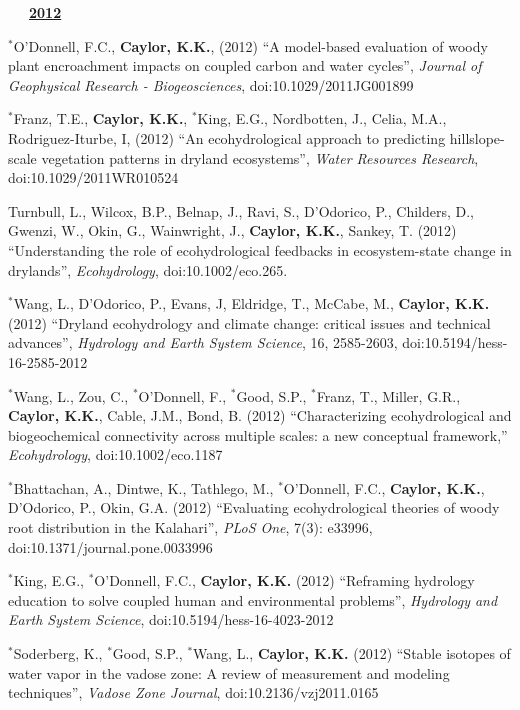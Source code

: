 \documentclass[10pt]{report}
\begin{document}
\begin{etaremune}
\mbox{\ \ \ \underline{\textbf{2012}}}

\item $^{*}$O'Donnell, F.C.,  \textbf{Caylor, K.K.}, (2012) ``A model-based evaluation of woody plant encroachment impacts on coupled carbon and water cycles'', {\em Journal of Geophysical Research - Biogeosciences}, doi:10.1029/2011JG001899

\item $^{*}$Franz, T.E., \textbf{Caylor, K.K.}, $^{*}$King, E.G., Nordbotten, J., Celia, M.A., Rodriguez-Iturbe, I, (2012) ``An ecohydrological approach to predicting hillslope-scale vegetation patterns in dryland ecosystems'', {\em Water Resources Research}, doi:10.1029/2011WR010524

\item Turnbull, L., Wilcox, B.P., Belnap, J., Ravi, S., D'Odorico, P., Childers, D., Gwenzi, W., Okin, G., Wainwright, J., \textbf{Caylor, K.K.}, Sankey, T. (2012) ``Understanding the role of ecohydrological feedbacks in ecosystem-state change in drylands'', {\em Ecohydrology}, doi:10.1002/eco.265.

\item $^{*}$Wang, L., D'Odorico, P., Evans, J, Eldridge, T., McCabe, M., \textbf{Caylor, K.K.} (2012) ``Dryland ecohydrology and climate change: critical issues and technical advances'', {\em Hydrology and Earth System Science}, 16, 2585-2603, doi:10.5194/hess-16-2585-2012

\item $^{*}$Wang, L., Zou, C., $^{*}$O'Donnell, F., $^{*}$Good, S.P., $^{*}$Franz, T., Miller, G.R., \textbf{Caylor, K.K.}, Cable, J.M., Bond, B. (2012) ``Characterizing ecohydrological and biogeochemical connectivity across multiple scales: a new conceptual framework,'' {\em Ecohydrology}, doi:10.1002/eco.1187

\item $^{*}$Bhattachan, A., Dintwe, K., Tathlego, M., $^{*}$O'Donnell, F.C.,  \textbf{Caylor, K.K.}, D'Odorico, P., Okin, G.A. (2012) ``Evaluating ecohydrological theories of woody root distribution in the Kalahari'', {\em PLoS One}, 7(3): e33996, doi:10.1371/journal.pone.0033996

\item $^{*}$King, E.G., $^{*}$O'Donnell, F.C., \textbf{Caylor, K.K.} (2012) ``Reframing hydrology education to solve coupled human and environmental problems'', {\em Hydrology and Earth System Science}, doi:10.5194/hess-16-4023-2012

\item $^{*}$Soderberg, K., $^{*}$Good, S.P., $^{*}$Wang, L., \textbf{Caylor, K.K.} (2012) ``Stable isotopes of water vapor in the vadose zone: A review of measurement and modeling techniques'', {\em Vadose Zone Journal}, doi:10.2136/vzj2011.0165


\end{etaremune}
\end{document}
